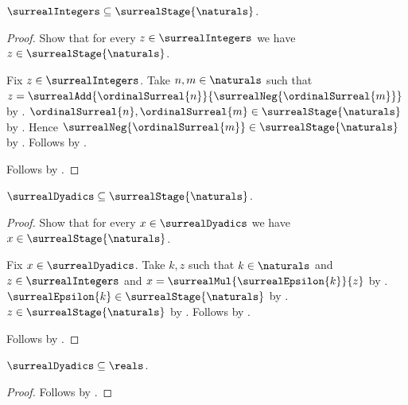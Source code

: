 \begin{lemma}\label{surreal_integer_finite_stage}
    $\surrealIntegers\subseteq\surrealStage{\naturals}$.
\end{lemma}
\begin{proof}
    Show that for every $z\in\surrealIntegers$ we have
        $z\in\surrealStage{\naturals}$.
    \begin{subproof}
        Fix $z\in\surrealIntegers$.
        Take $n,m\in\naturals$ such that
            $z=\surrealAdd{\ordinalSurreal{n}}
                {\surrealNeg{\ordinalSurreal{m}}}$
            by .
        $\ordinalSurreal{n},\ordinalSurreal{m}
            \in\surrealStage{\naturals}$
            by
            .
        Hence $\surrealNeg{\ordinalSurreal{m}}
            \in\surrealStage{\naturals}$
            by .
        Follows by .
    \end{subproof}
    Follows by .
\end{proof}

\begin{theorem}\label{surreal_dyadics_finite_stage}
    $\surrealDyadics\subseteq\surrealStage{\naturals}$.
\end{theorem}
\begin{proof}
    Show that for every $x\in\surrealDyadics$ we have
        $x\in\surrealStage{\naturals}$.
    \begin{subproof}
        Fix $x\in\surrealDyadics$.
        Take $k,z$ such that $k\in\naturals$ and
            $z\in\surrealIntegers$ and
            $x=\surrealMul{\surrealEpsilon{k}}{z}$
            by .
        $\surrealEpsilon{k}\in\surrealStage{\naturals}$
            by .
        $z\in\surrealStage{\naturals}$
            by .
        Follows by .
    \end{subproof}
    Follows by .
\end{proof}

\begin{corollary}\label{surreal_dyadics_subset_reals}
    $\surrealDyadics\subseteq\reals$.
\end{corollary}
\begin{proof}
    Follows by
        .
\end{proof}

